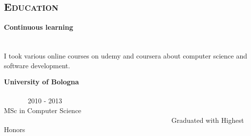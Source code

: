 \begin{resume}
%
%
%
%
%
%
%


        \section{\textsc{Education}}

        \textbf{Continuous learning} \ \ \ \ \ \ \ \ \ \ \ \ \ \ \ \ \ \ \ \ \ \ \ \ \ \ \ \ \ \ \ \ \ \ \ \ \ \ \ \ \ \ \ \ \ \ \ \ \ \ \ \ \ \ \ \ \ \ \ \ \ \ \ \ \ \ \ \ \ \ \ \ \ \ \ \ \ \ \ \ \ \  \\
        I took various online courses on udemy and coursera about computer science and software development.

        \textbf{University of Bologna} \ \ \ \ \ \ \ \ \ \ \ \ \ \ \ \ \ \ \ \ \ \ \ \ \ \ \ \ \ \ \ \ \ \ \ \ \ \ \ \ \ \ \ \ \ \ \ \ \ \ \ \ \ \ \ \ \ \ \ \ \ \ \ \ \ \ \ \ \ \ \ \ \ \ \ \ \ \ \ 2010 - 2013 \\
        MSc in Computer Science  \ \ \ \ \ \ \ \ \ \ \ \ \ \ \ \ \ \ \ \ \ \ \ \ \ \ \ \ \ \ \ \ \ \ \ \ \ \ \ \ \ \ \ \ \ \ \ \ \ Graduated with Highest Honors


\end{resume}
